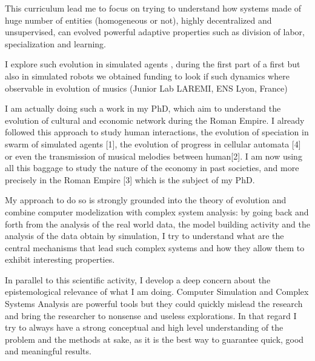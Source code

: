\documentclass[10pt]{paper}
\begin{document}
This curriculum lead me to focus on trying to understand how systems made of huge number of entities (homogeneous or not), highly decentralized and unsupervised, can evolved powerful adaptive properties such as division of labor, specialization and learning.

I explore such evolution in simulated agents , during the first part of a first but also in simulated robots we obtained funding to look if such dynamics where observable in evolution of musics (Junior Lab LAREMI, ENS Lyon, France)

I am actually doing such a work in my PhD, which aim to understand the evolution of cultural and economic network during the Roman Empire. 
I already followed this approach to study human interactions, the evolution of speciation in swarm of simulated agents [1], the evolution of progress in cellular automata [4] or even the transmission of musical melodies between human[2]. I am now using all this baggage to study the nature of the economy in past societies, and more precisely in the Roman Empire [3] which is the subject of my PhD. 

My approach to do so is strongly grounded into the theory of evolution and combine computer modelization with complex system analysis: by going back and forth from the analysis of the real world data, the model building activity and the analysis of the data obtain by simulation, I try to understand what are the central mechanisms that lead such complex systems and how they allow them to exhibit interesting properties. 

In parallel to this scientific activity, I develop a deep concern about the epistemological relevance of what I am doing. Computer Simulation and Complex Systems Analysis are powerful tools but they could quickly mislead the research and bring the researcher to nonsense and useless explorations. In that regard I try to always have a strong conceptual and high level understanding of the problem and the methods at sake, as it is the best way to guarantee quick, good and meaningful results. 
\end{document}
